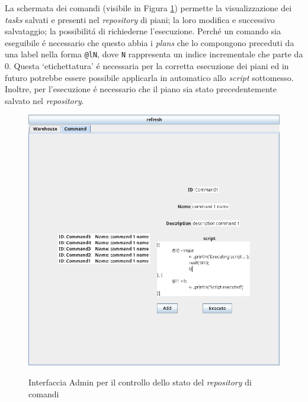 \parag
La schermata dei comandi (visibile in Figura \ref{fig:application-command}) permette la visualizzazione dei \textit{tasks} salvati e presenti nel \textit{repository} di piani; la loro modifica e successivo salvataggio; la possibilit\'a di richiederne l'esecuzione. Perch\'e un comando sia eseguibile \'e necessario che questo abbia i \textit{plans} che lo compongono preceduti da una label nella forma \texttt{@lN}, dove \texttt{N} rappresenta un indice incrementale che parte da 0. Questa `etichettatura' \'e necessaria per la corretta esecuzione dei piani ed in futuro potrebbe essere possibile applicarla in automatico allo \textit{script} sottomesso. Inoltre, per l'esecuzione \'e necessario che il piano sia stato precedentemente salvato nel \textit{repository}.
\begin{figure}
    \includegraphics[width=\textwidth]{section/usage_examples/figure/application-command.png}
    \label{fig:application-command}
    \caption{Interfaccia Admin per il controllo dello stato del \textit{repository} di comandi}
\end{figure}
